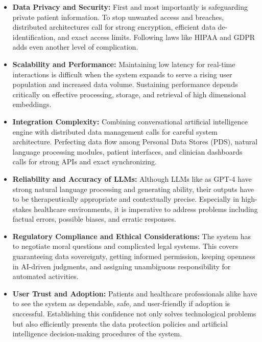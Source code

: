 \begin{itemize}[itemsep=2em]
    \item \textbf{Data Privacy and Security:}  
          First and most importantly is safeguarding private patient information. To stop unwanted access and breaches, distributed architectures call for strong encryption, efficient data de-identification, and exact access limits. Following laws like HIPAA and GDPR adds even another level of complication.
          
    \item \textbf{Scalability and Performance:}  
          Maintaining low latency for real-time interactions is difficult when the system expands to serve a rising user population and increased data volume. Sustaining performance depends critically on effective processing, storage, and retrieval of high dimensional embeddings.
          
    \item \textbf{Integration Complexity:}  
          Combining conversational artificial intelligence engine with distributed data management calls for careful system architecture. Perfecting data flow among Personal Data Stores (PDS), natural language processing modules, patient interfaces, and clinician dashboards calls for strong APIs and exact synchronizing.

          
    \item \textbf{Reliability and Accuracy of LLMs:}  
          Although LLMs like as GPT-4 have strong natural language processing and generating ability, their outputs have to be therapeutically appropriate and contextually precise. Especially in high-stakes healthcare environments, it is imperative to address problems including factual errors, possible biases, and erratic responses.
          
    \item \textbf{Regulatory Compliance and Ethical Considerations:}  
          The system has to negotiate moral questions and complicated legal systems. This covers guaranteeing data sovereignty, getting informed permission, keeping openness in AI-driven judgments, and assigning unambiguous responsibility for automated activities.

          
    \item \textbf{User Trust and Adoption:}  
          Patients and healthcare professionals alike have to see the system as dependable, safe, and user-friendly if adoption is successful. Establishing this confidence not only solves technological problems but also efficiently presents the data protection policies and artificial intelligence decision-making procedures of the system.
\end{itemize}


